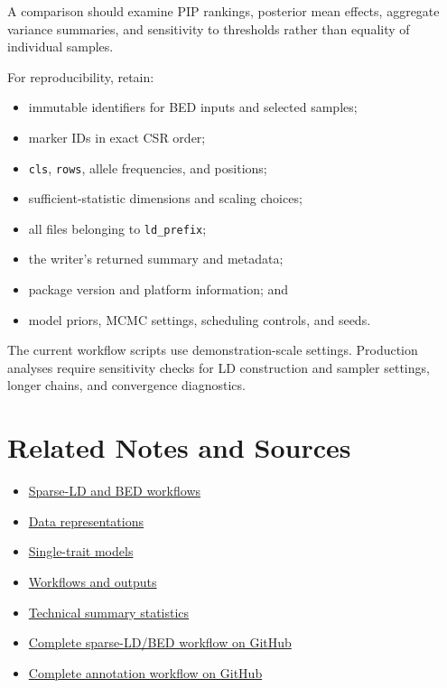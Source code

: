\documentclass[
  11pt,
  letterpaper,
  DIV=11,
  numbers=noendperiod]{scrartcl}
\providecommand{\tightlist}{%
  \setlength{\itemsep}{0pt}\setlength{\parskip}{0pt}}
\begin{document}
A comparison should examine PIP rankings, posterior mean effects,
aggregate variance summaries, and sensitivity to thresholds rather than
equality of individual samples.

For reproducibility, retain:

\begin{itemize}
\tightlist
\item
  immutable identifiers for BED inputs and selected samples;
\item
  marker IDs in exact CSR order;
\item
  \texttt{cls}, \texttt{rows}, allele frequencies, and positions;
\item
  sufficient-statistic dimensions and scaling choices;
\item
  all files belonging to \texttt{ld\_prefix};
\item
  the writer's returned summary and metadata;
\item
  package version and platform information; and
\item
  model priors, MCMC settings, scheduling controls, and seeds.
\end{itemize}

The current workflow scripts use demonstration-scale settings.
Production analyses require sensitivity checks for LD construction and
sampler settings, longer chains, and convergence diagnostics.

\section{Related Notes and Sources}\label{related-notes-and-sources}

\begin{itemize}
\tightlist
\item
  \href{sparse_ld_and_bed_workflows.html}{Sparse-LD and BED workflows}
\item
  \href{data_representations.html}{Data representations}
\item
  \href{single_trait_models.html}{Single-trait models}
\item
  \href{workflows_and_outputs.html}{Workflows and outputs}
\item
  \href{technical_summary_statistics.html}{Technical summary statistics}
\item
  \href{https://github.com/psoerensen/sblr/blob/master/examples/workflows/sparse_ld_bed_workflow.R}{Complete
  sparse-LD/BED workflow on GitHub}
\item
  \href{https://github.com/psoerensen/sblr/blob/master/examples/workflows/annotation_based_models.R}{Complete
  annotation workflow on GitHub}
\end{itemize}
\end{document}
